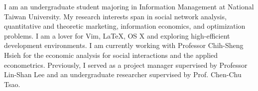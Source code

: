 

\begin{cvparagraph}

I am an undergraduate student majoring in Information Management 
at National Taiwan University. 
My research interests span in social network analysis, 
quantitative and theoretic marketing, information economics,
and optimization problems.
I am a lover for Vim, 
\LaTeX, OS X and exploring high-efficient development environments. 
I am currently working with Professor Chih-Sheng Hsieh for the
economic analysis for social interactions and the applied econometrics.
Previously, I served as a project manager supervised by 
Professor Lin-Shan Lee and an 
undergraduate researcher supervised by Prof. Chen-Chu Tsao.
\end{cvparagraph}
